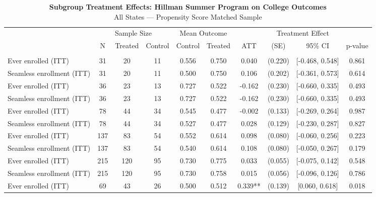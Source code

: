 \begin{table}[t]
\caption*{
{\fontsize{10}{12}\selectfont  \textbf{Subgroup Treatment Effects: Hillman Summer Program on College Outcomes}\fontsize{8}{10}\selectfont } \\ 
{\fontsize{8}{10}\selectfont  All States — Propensity Score Matched Sample\fontsize{8}{10}\selectfont }
} 
\fontsize{8.0pt}{10.0pt}\selectfont
\begin{tabular*}{\linewidth}{@{\extracolsep{\fill}}l|ccccccccc}
\toprule
 & \multicolumn{3}{c}{Sample Size} & \multicolumn{2}{c}{Mean Outcome} & \multicolumn{4}{c}{Treatment Effect} \\ 
\cmidrule(lr){2-4} \cmidrule(lr){5-6} \cmidrule(lr){7-10}
 & N & Treated & Control & Control & Treated & ATT & (SE) & 95\% CI & p-value \\ 
\midrule\addlinespace[2.5pt]
\multicolumn{10}{l}{{\itshape \textbf{Panel A: Enrollment Outcomes} \emph{(full matched subgroup sample)}}} \\[2.5pt] 
\midrule\addlinespace[2.5pt]
Ever enrolled (ITT) & {31} & {20} & {11} & {0.556} & {0.750} & {0.040} & {(0.220)} & {[-0.468, 0.548]} & {0.861} \\ 
Seamless enrollment (ITT) & 31 & 20 & 11 & 0.500 & 0.750 & 0.106 & (0.202) & [-0.361, 0.573] & 0.614 \\ 
Ever enrolled (ITT) & 36 & 23 & 13 & 0.727 & 0.522 & -0.162 & (0.230) & [-0.660, 0.335] & 0.493 \\ 
Seamless enrollment (ITT) & 36 & 23 & 13 & 0.727 & 0.522 & -0.162 & (0.230) & [-0.660, 0.335] & 0.493 \\ 
Ever enrolled (ITT) & 78 & 44 & 34 & 0.545 & 0.477 & -0.002 & (0.133) & [-0.269, 0.264] & 0.987 \\ 
Seamless enrollment (ITT) & 78 & 44 & 34 & 0.527 & 0.477 & 0.028 & (0.129) & [-0.230, 0.287] & 0.827 \\ 
Ever enrolled (ITT) & 137 & 83 & 54 & 0.552 & 0.614 & 0.098 & (0.080) & [-0.060, 0.256] & 0.223 \\ 
Seamless enrollment (ITT) & 137 & 83 & 54 & 0.540 & 0.614 & 0.108 & (0.080) & [-0.050, 0.267] & 0.179 \\ 
Ever enrolled (ITT) & 215 & 120 & 95 & 0.730 & 0.775 & 0.033 & (0.055) & [-0.075, 0.142] & 0.548 \\ 
Seamless enrollment (ITT) & 215 & 120 & 95 & 0.730 & 0.758 & 0.015 & (0.056) & [-0.096, 0.126] & 0.786 \\ 
Ever enrolled (ITT) & 69 & 43 & 26 & 0.500 & 0.512 & 0.339** & (0.139) & [0.060, 0.618] & 0.018 \\ 

\end{tabular*}
\end{table}
